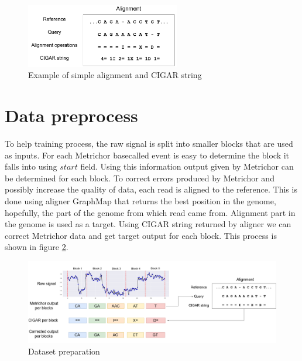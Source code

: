 \documentclass[times, utf8, diplomski, numeric, english]{fer}
\begin{document}
\begin{figure}[!ht]
	\begin{center}
		\includegraphics[width=0.6\textwidth]{./imgs/alignment.png}
		\caption{Example of simple alignment and CIGAR string}
		\label{fg:align}
	\end{center}
\end{figure} 


\section{Data preprocess}

To help training process, the raw signal is split into smaller blocks that are used as inputs. For each Metrichor basecalled event is easy to determine the block it falls into using $start$ field. Using this information output given by Metrichor can be determined for each block. 
To correct errors produced by Metrichor and possibly increase the quality of data, each read is aligned to the reference. This is done using aligner GraphMap \cite{sovic} that returns the best position in the genome, hopefully, the part of the genome from which read came from.
Alignment part in the genome is used as a target. Using CIGAR string returned by aligner we can correct Metrichor data and get target output for each block. This process is shown in figure \ref{fg:data_correction}.

\begin{figure}[!ht]
	\begin{center}
		\includegraphics[width=1\textwidth]{./imgs/train_data_correction.png}
		\caption{Dataset preparation}
		\label{fg:data_correction}
	\end{center}
\end{figure}
\end{document}
